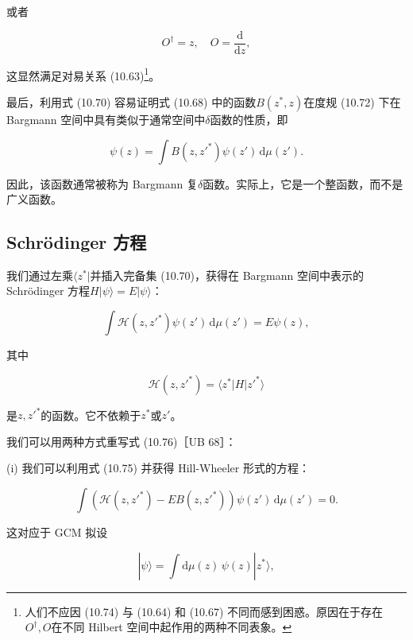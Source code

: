 或者

\begin{equation}
O^{\dagger}=z,\quad O=\frac{\mathrm{d}}{\mathrm{d}z},\label{eq:10.74}
\end{equation}

这显然满足对易关系 (10.63)\footnote{人们不应因 (10.74) 与 (10.64) 和 (10.67) 不同而感到困惑。原因在于存在$O^{\dagger},O$在不同
Hilbert 空间中起作用的两种不同表象。}。

最后，利用式 (10.70) 容易证明式 (10.68) 中的函数$B(z^{*},z)$在度规 (10.72) 下在 Bargmann
空间中具有类似于通常空间中$\delta$函数的性质，即

\begin{equation}
\psi(z)=\int B(z,z'^{*})\psi(z')\,\mathrm{d}\mu(z').\label{eq:10.75}
\end{equation}

因此，该函数通常被称为 Bargmann 复$\delta$函数。实际上，它是一个整函数，而不是广义函数。

\subsection{Schrödinger 方程}

我们通过左乘$\langle z^{*}|$并插入完备集 (10.70)，获得在 Bargmann 空间中表示的 Schrödinger
方程$H|\psi\rangle=E|\psi\rangle$：

\begin{equation}
\int\mathscr{H}(z,z'^{*})\psi(z')\,\mathrm{d}\mu(z')=E\psi(z),\label{eq:10.76}
\end{equation}

其中

\begin{equation}
\mathscr{H}(z,z'^{*})=\langle z^{*}|H|z'^{*}\rangle\label{eq:10.77}
\end{equation}

是$z,z'^{*}$的函数。它不依赖于$z^{*}$或$z'$。

我们可以用两种方式重写式 (10.76)［UB 68］：

(i) 我们可以利用式 (10.75) 并获得 Hill-Wheeler 形式的方程：

\begin{equation}
\int\left(\mathscr{H}(z,z'^{*})-EB(z,z'^{*})\right)\psi(z')\,\mathrm{d}\mu(z')=0.\label{eq:10.78}
\end{equation}

这对应于 GCM 拟设

\begin{equation}
|\psi\rangle=\int\mathrm{d}\mu(z)\,\psi(z)|z^{*}\rangle,\label{eq:coherent_state_gcm_ansatz}
\end{equation}

